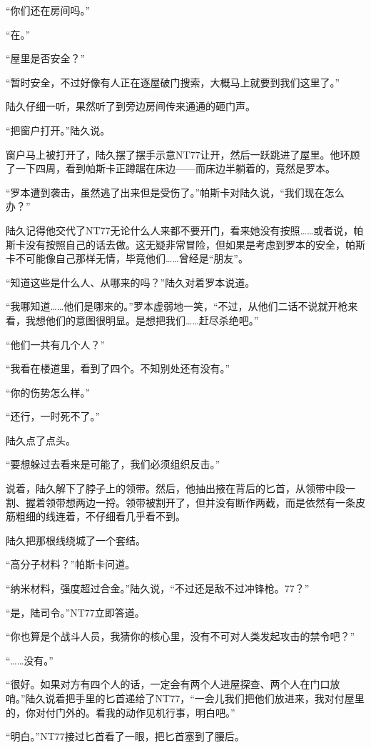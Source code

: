 “你们还在房间吗。”

“在。”

“屋里是否安全？”

“暂时安全，不过好像有人正在逐屋破门搜索，大概马上就要到我们这里了。”

陆久仔细一听，果然听了到旁边房间传来通通的砸门声。

“把窗户打开。”陆久说。

窗户马上被打开了，陆久摆了摆手示意NT77让开，然后一跃跳进了屋里。他环顾了一下四周，看到帕斯卡正蹲踞在床边——而床边半躺着的，竟然是罗本。

“罗本遭到袭击，虽然逃了出来但是受伤了。”帕斯卡对陆久说，“我们现在怎么办？”

陆久记得他交代了NT77无论什么人来都不要开门，看来她没有按照……或者说，帕斯卡没有按照自己的话去做。这无疑非常冒险，但如果是考虑到罗本的安全，帕斯卡不可能像自己那样无情，毕竟他们……曾经是“朋友”。

“知道这些是什么人、从哪来的吗？”陆久对着罗本说道。

“我哪知道……他们是哪来的。”罗本虚弱地一笑，“不过，从他们二话不说就开枪来看，我想他们的意图很明显。是想把我们……赶尽杀绝吧。”

“他们一共有几个人？”

“我看在楼道里，看到了四个。不知别处还有没有。”

“你的伤势怎么样。”

“还行，一时死不了。”

陆久点了点头。

“要想躲过去看来是可能了，我们必须组织反击。”

说着，陆久解下了脖子上的领带。然后，他抽出掖在背后的匕首，从领带中段一割、握着领带想两边一捋。领带被割开了，但并没有断作两截，而是依然有一条皮筋粗细的线连着，不仔细看几乎看不到。

陆久把那根线绕城了一个套结。

“高分子材料？”帕斯卡问道。

“纳米材料，强度超过合金。”陆久说，“不过还是敌不过冲锋枪。77？”

“是，陆司令。”NT77立即答道。

“你也算是个战斗人员，我猜你的核心里，没有不可对人类发起攻击的禁令吧？”

“……没有。”

“很好。如果对方有四个人的话，一定会有两个人进屋探查、两个人在门口放哨。”陆久说着把手里的匕首递给了NT77，“一会儿我们把他们放进来，我对付屋里的，你对付门外的。看我的动作见机行事，明白吧。”

“明白。”NT77接过匕首看了一眼，把匕首塞到了腰后。

